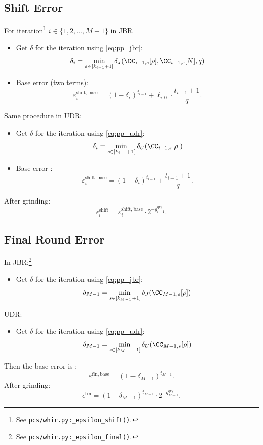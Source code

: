 \subsection{Shift Error}

For iteration\footnote{See \texttt{pcs/whir.py:\_epsilon\_shift()}.} \(i\in\{1,2,\ldots,M-1\}\) in JBR
\begin{itemize}
    \item   Get $\delta$ for the iteration using \eqref{eq:pp_jbr}:
    $$
    \delta_i =\min_{s\in[k_{i-1}+1]}\delta_J(\CC_{i-1,s}[\rho],\CC_{i-1,s}[N],q)
    $$
\item Base error (two terms):
\[
  \varepsilon^{\mathrm{shift,base}}_i
    = (1 - \delta_i )^{t_{i-1}}
      + \ell_{i,0} \cdot \frac{t_{i-1} + 1}{  q}.
\]

\end{itemize}

Same procedure in UDR:
\begin{itemize}
    \item   Get $\delta$ for the iteration using \eqref{eq:pp_udr}:
    $$
    \delta_i =\min_{s\in[k_{i-1}+1]}\delta_U(\CC_{i-1,s}[\rho])
    $$
\item Base error  :
\[
  \varepsilon^{\mathrm{shift,base}}_i
    = (1 - \delta_i )^{t_{i-1}}
      +   \frac{t_{i-1} + 1}{q}.
\]

\end{itemize}

 After grinding:
\[
  \epsilon^{\mathrm{shift}}_i
    = \varepsilon^{\mathrm{shift,base}}_i
      \cdot 2^{-g^{\mathrm{qry}}_{i-1}}.
\]


\subsection{Final Round Error}

In JBR:\footnote{See \texttt{pcs/whir.py:\_epsilon\_final()}.}
\begin{itemize}
    \item  Get $\delta$ for the iteration using \eqref{eq:pp_jbr}:
    $$
    \delta_{M-1} =\min_{s\in[k_{M-1}+1]}\delta_J(\CC_{M-1,s}[\rho])
    $$
\end{itemize}
UDR:
 \begin{itemize}
    \item  Get $\delta$ for the iteration using \eqref{eq:pp_udr}:
    $$
    \delta_{M-1} =\min_{s\in[k_{M-1}+1]}\delta_U(\CC_{M-1,s}[\rho])
    $$
\end{itemize}
Then
the base error is :
\[
  \varepsilon^{\mathrm{fin,base}}
    = (1 - \delta_{M-1})^{t_{M-1}}.
\]
After grinding:
\[
  \epsilon^{\mathrm{fin}}
  = (1 - \delta_{M-1})^{t_{M-1}}
    \cdot 2^{-g^{\mathrm{qry}}_{M-1}}.
\]
\newpage
